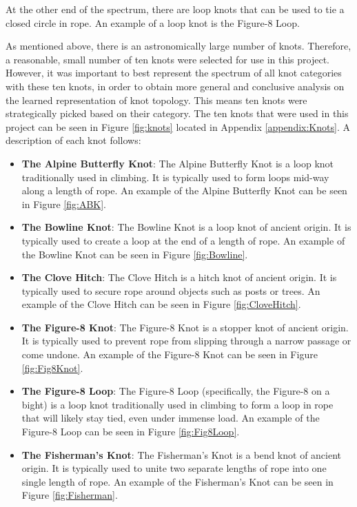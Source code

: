 \documentclass{l4proj}
\begin{document}
At the other end of the spectrum, there are loop knots that can be used to tie a closed circle in rope.
An example of a loop knot is the Figure-8 Loop.

As mentioned above, there is an astronomically large number of knots.
Therefore, a reasonable, small number of ten knots were selected for use in this project.
However, it was important to best represent the spectrum of all knot categories with these ten knots, in order to obtain more general and conclusive analysis on the learned representation of knot topology.
This means ten knots were strategically picked based on their category.
The ten knots that were used in this project can be seen in Figure \ref{fig:knots} located in Appendix \ref{appendix:Knots}.
A description of each knot follows:
\begin{itemize}
	\item \textbf{The Alpine Butterfly Knot}: The Alpine Butterfly Knot is a loop knot traditionally used in climbing. It is typically used to form loops mid-way along a length of rope. An example of the Alpine Butterfly Knot can be seen in Figure \ref{fig:ABK}.
	\item \textbf{The Bowline Knot}: The Bowline Knot is a loop knot of ancient origin. It is typically used to create a loop at the end of a length of rope. An example of the Bowline Knot can be seen in Figure \ref{fig:Bowline}.
	\item \textbf{The Clove Hitch}: The Clove Hitch is a hitch knot of ancient origin. It is typically used to secure rope around objects such as posts or trees. An example of the Clove Hitch can be seen in Figure \ref{fig:CloveHitch}.
	\item \textbf{The Figure-8 Knot}: The Figure-8 Knot is a stopper knot of ancient origin. It is typically used to prevent rope from slipping through a narrow passage or come undone. An example of the Figure-8 Knot can be seen in Figure \ref{fig:Fig8Knot}.
	\item \textbf{The Figure-8 Loop}: The Figure-8 Loop (specifically, the Figure-8 on a bight) is a loop knot traditionally used in climbing to form a loop in rope that will likely stay tied, even under immense load. An example of the Figure-8 Loop can be seen in Figure \ref{fig:Fig8Loop}.
	\item \textbf{The Fisherman's Knot}: The Fisherman's Knot is a bend knot of ancient origin. It is typically used to unite two separate lengths of rope into one single length of rope. An example of the Fisherman's Knot can be seen in Figure \ref{fig:Fisherman}.

\end{itemize}
\end{document}
